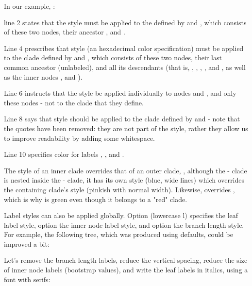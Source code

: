 \noindent{}In our example, :
\startitemize
	\item line 2 states that the style  must be applied
		to the  defined by  and
		, which consists of these two nodes, their ancestor
		, and . 
	\item Line 4 prescribes that style  (an \svg{}
		hexadecimal color specification) must be applied to the clade defined by
		 and , which consists of these two nodes,
		their last common ancestor (unlabeled), and all its descendants (that is,
		, , , , and
		, as well as the inner nodes ,
		 and ). 
	\item Line 6 instructs that the style  be applied
		individually to nodes  and , and only
		these nodes - not to the clade that they define.  
	\item Line 8 says that style  should be
		applied to the clade defined by  and  - note that
		the quotes have been removed: they are not part of the style, rather they
		allow us to improve readability by adding some whitespace.
	\item Line 10 specifies color  for labels ,
		,
		and .
\stopitemize

The style of an inner clade overrides that of an outer clade, \eg,
although the  -  clade is nested inside the
 -  clade, it has its own style (blue, wide
lines) which overrides the containing clade's style (pinkish with normal
width).  Likewise,  overrides , which is why
 is green even though it belongs to a "red" clade.

\bigskip

Label styles can also be applied globally. Option  (lowercase l)
specifies the leaf label style, option  the inner node label style,
and option  the branch length style. For example, the following tree,
which was produced using defaults, could be improved a bit:

\startalignment[center]
\stopalignment

\noindent{}Let's remove the branch length labels, reduce
the vertical spacing, reduce the size of inner node labels (bootstrap values),
and write the leaf labels in italics, using a font with serifs:

